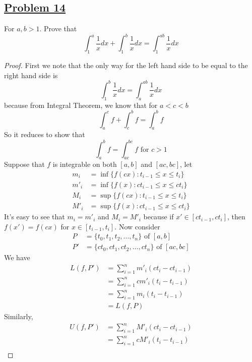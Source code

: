 \documentclass[10pt,letterpaper]{article}
\begin{document}
	\subsection*{{\color{purple}\underline{Problem 14}}}
	For $a, b > 1$. Prove that
	$$\displaystyle\int_{1}^{a} \dfrac{1}{x} dx + \displaystyle\int_{1}^{b} \dfrac{1}{x} dx = \displaystyle\int_{1}^{ab}
	\dfrac{1}{x} dx$$	
	\begin{proof}
	First we note that the only way for the left hand side to be equal to the right hand side is
	$$\displaystyle\int_{1}^{b} \dfrac{1}{x} dx =  \displaystyle\int_{a}^{ab} \dfrac{1}{x} dx$$
	because from Integral Theorem, we know that for $a < c < b$
	$$\displaystyle\int_{a}^{c}f + \displaystyle\int_{c}^{b}f = \displaystyle\int_{a}^{b}f$$
	So it reduces to show that 
	$$\displaystyle\int_{a}^{b} f = \displaystyle\int_{ac}^{bc} f \text{ for } c > 1$$
	Suppose that $f$ is integrable on both $[a, b]$ and $[ac, bc]$, let
	\begin{align*}	
	m_i &= \inf\{f(cx): t_{i-1} \leq x \leq t_{i}\} \\
	m'_i &= \inf\{f(x): ct_{i-1} \leq x \leq ct_{i}\} \\
	M_i &= \sup\{f(cx): t_{i-1} \leq x \leq t_{i}\} \\
	M'_i &= \sup\{f(x): ct_{i-1} \leq x \leq ct_{i}\} 		
	\end{align*}
	It's easy to see that $m_i = m'_i$ and $M_i = M'_i$ because if $x' \in [ct_{i-1}, ct_{i}]$, then $f(x') = f(cx)$ for $x \in [t_{i-1}, t_{i}]$.
	Now consider 
	\begin{align*}
		P  &= \{t_0, t_1, t_2, \ldots ,t_n\} \text{ of } [a, b] \\
		P' &= \{ct_0, ct_1, ct_2, \ldots ,ct_n\} \text{ of } [ac, bc] 
	\end{align*}
	We have
	\begin{align*}
		L(f, P') 
		&= \displaystyle\sum_{i=1}^{n} m'_i(ct_i - ct_{i-1})\\
		&= \displaystyle\sum_{i=1}^{n} cm'_i(t_i - t_{i-1}) \\
		&= \displaystyle\sum_{i=1}^{n} m_i(t_i - t_{i-1}) \\
		&= L(f, P)
	\end{align*}
	Similarly,
	\begin{align*}
		U(f, P') 
		&= \displaystyle\sum_{i=1}^{n} M'_i(ct_i - ct_{i-1})\\
		&= \displaystyle\sum_{i=1}^{n} cM'_i(t_i - t_{i-1}) \\

\end{align*}
\end{proof}
\end{document}

